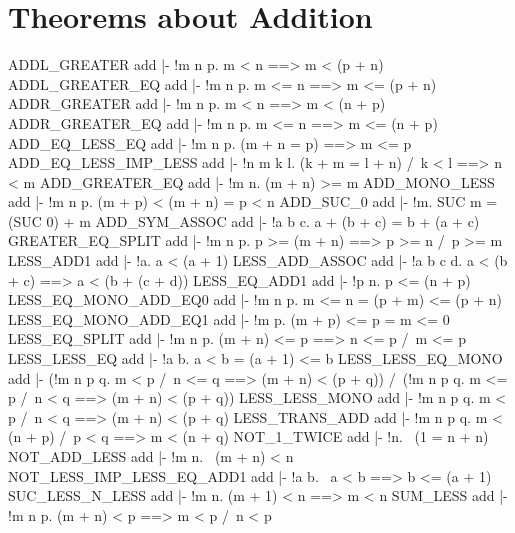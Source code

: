 \section{Theorems about Addition}
\THEOREM ADDL\_GREATER add
|- !m n p. m < n ==> m < (p + n)
\ENDTHEOREM
\THEOREM ADDL\_GREATER\_EQ add
|- !m n p. m <= n ==> m <= (p + n)
\ENDTHEOREM
\THEOREM ADDR\_GREATER add
|- !m n p. m < n ==> m < (n + p)
\ENDTHEOREM
\THEOREM ADDR\_GREATER\_EQ add
|- !m n p. m <= n ==> m <= (n + p)
\ENDTHEOREM
\THEOREM ADD\_EQ\_LESS\_EQ add
|- !m n p. (m + n = p) ==> m <= p
\ENDTHEOREM
\THEOREM ADD\_EQ\_LESS\_IMP\_LESS add
|- !n m k l. (k + m = l + n) /\ k < l ==> n < m
\ENDTHEOREM
\THEOREM ADD\_GREATER\_EQ add
|- !m n. (m + n) >= m
\ENDTHEOREM
\THEOREM ADD\_MONO\_LESS add
|- !m n p. (m + p) < (m + n) = p < n
\ENDTHEOREM
\THEOREM ADD\_SUC\_0 add
|- !m. SUC m = (SUC 0) + m
\ENDTHEOREM
\THEOREM ADD\_SYM\_ASSOC add
|- !a b c. a + (b + c) = b + (a + c)
\ENDTHEOREM
\THEOREM GREATER\_EQ\_SPLIT add
|- !m n p. p >= (m + n) ==> p >= n /\ p >= m
\ENDTHEOREM
\THEOREM LESS\_ADD1 add
|- !a. a < (a + 1)
\ENDTHEOREM
\THEOREM LESS\_ADD\_ASSOC add
|- !a b c d. a < (b + c) ==> a < (b + (c + d))
\ENDTHEOREM
\THEOREM LESS\_EQ\_ADD1 add
|- !p n. p <= (n + p)
\ENDTHEOREM
\THEOREM LESS\_EQ\_MONO\_ADD\_EQ0 add
|- !m n p. m <= n = (p + m) <= (p + n)
\ENDTHEOREM
\THEOREM LESS\_EQ\_MONO\_ADD\_EQ1 add
|- !m p. (m + p) <= p = m <= 0
\ENDTHEOREM
\THEOREM LESS\_EQ\_SPLIT add
|- !m n p. (m + n) <= p ==> n <= p /\ m <= p
\ENDTHEOREM
\THEOREM LESS\_LESS\_EQ add
|- !a b. a < b = (a + 1) <= b
\ENDTHEOREM
\THEOREM LESS\_LESS\_EQ\_MONO add
|- (!m n p q. m < p /\ n <= q ==> (m + n) < (p + q)) /\
   (!m n p q. m <= p /\ n < q ==> (m + n) < (p + q))
\ENDTHEOREM
\THEOREM LESS\_LESS\_MONO add
|- !m n p q. m < p /\ n < q ==> (m + n) < (p + q)
\ENDTHEOREM
\THEOREM LESS\_TRANS\_ADD add
|- !m n p q. m < (n + p) /\ p < q ==> m < (n + q)
\ENDTHEOREM
\THEOREM NOT\_1\_TWICE add
|- !n. ~(1 = n + n)
\ENDTHEOREM
\THEOREM NOT\_ADD\_LESS add
|- !m n. ~(m + n) < n
\ENDTHEOREM
\THEOREM NOT\_LESS\_IMP\_LESS\_EQ\_ADD1 add
|- !a b. ~a < b ==> b <= (a + 1)
\ENDTHEOREM
\THEOREM SUC\_LESS\_N\_LESS add
|- !m n. (m + 1) < n ==> m < n
\ENDTHEOREM
\THEOREM SUM\_LESS add
|- !m n p. (m + n) < p ==> m < p /\ n < p
\ENDTHEOREM
